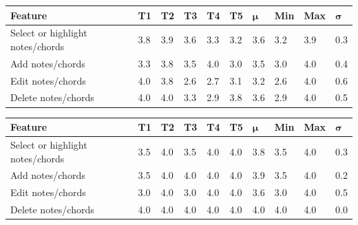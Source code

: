 		\begin{table}[!htpb]
		  \centering
		   \label{tab:common-samples-it2}
		  \begin{tabular}{|p{3cm}|R{.7cm}|R{.7cm}|R{.7cm}|R{.7cm}|R{.7cm}|R{.8cm}|R{.8cm}|R{.8cm}|R{.8cm}|}
		  	\hline
		  	\textbf{Feature} & \textbf{T1} & \textbf{T2} & \textbf{T3} & \textbf{T4} & \textbf{T5} & \begin{math}\bm{\mu}\end{math} & \textbf{Min} & \textbf{Max} & \begin{math}\bm{\sigma}\end{math} \\ \hline

		  	Select or highlight notes/chords 	& 3.8 & 3.9 & 3.6 & 3.3 & 3.2 & 3.6 & 3.2 & 3.9 & 0.3 \\ \hline
			Add notes/chords 						& 3.3 & 3.8 & 3.5 & 4.0 & 3.0 & 3.5 & 3.0 & 4.0 & 0.4 \\ \hline
			Edit notes/chords 						& 4.0 & 3.8 & 2.6 & 2.7 & 3.1 & 3.2 & 2.6 & 4.0 & 0.6 \\ \hline
			Delete notes/chords 					& 4.0 & 4.0 & 3.3 & 2.9 & 3.8 & 3.6 & 2.9 & 4.0 & 0.5 \\ \hline
			

		  \end{tabular}
		\end{table}

		\begin{table}[H]
		  \centering
		   \label{tab:common-samples-it3}
		  \begin{tabular}{|p{3cm}|R{.7cm}|R{.7cm}|R{.7cm}|R{.7cm}|R{.7cm}|R{.8cm}|R{.8cm}|R{.8cm}|R{.8cm}|}
		  	\hline
		  	\textbf{Feature} & \textbf{T1} & \textbf{T2} & \textbf{T3} & \textbf{T4} & \textbf{T5} & \begin{math}\bm{\mu}\end{math} & \textbf{Min} & \textbf{Max} & \begin{math}\bm{\sigma}\end{math} \\ \hline

		  	Select or highlight notes/chords 	& 3.5 & 4.0 & 3.5 & 4.0 & 4.0 & 3.8 & 3.5 & 4.0 & 0.3 \\ \hline
			Add notes/chords 						& 3.5 & 4.0 & 4.0 & 4.0 & 4.0 & 3.9 & 3.5 & 4.0 & 0.2 \\ \hline
			Edit notes/chords 						& 3.0 & 4.0 & 3.0 & 4.0 & 4.0 & 3.6 & 3.0 & 4.0 & 0.5 \\ \hline
			Delete notes/chords 					& 4.0 & 4.0 & 4.0 & 4.0 & 4.0 & 4.0 & 4.0 & 4.0 & 0.0 \\ \hline

		  \end{tabular}
		\end{table}


